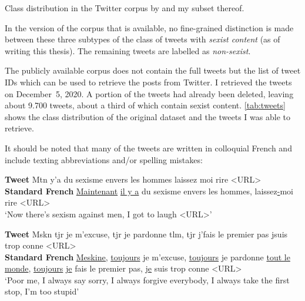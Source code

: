 \begin{table}[tb]
\begin{center}

\end{center}
\caption{Class distribution in the Twitter corpus by \citet{chiril2020annotated} and my subset thereof.}
\label{tab:tweets}
\end{table}

In the version of the corpus that is available, no fine-grained distinction is made between these three subtypes of the class of tweets with \textit{sexist content} (as of writing this thesis).
The remaining tweets are labelled as \textit{non-sexist}.

The publicly available corpus does not contain the full tweets but the list of tweet IDs which can be used to retrieve the posts from Twitter.
I retrieved the tweets on December~5, 2020. 
A portion of the tweets had already been deleted, leaving about 9.700 tweets, about a third of which contain sexist content.
\autoref{tab:tweets} shows the class distribution of the original dataset and the tweets I was able to retrieve.



It should be noted that many of the tweets are written in colloquial French and include texting abbreviations and/or spelling mistakes:


\begin{exe}
\ex 
\gll
\textbf{Tweet} Mtn y'a du sexisme envers les hommes {laissez moi} rire <URL>\\
\textbf{Standard French} \underline{Maintenant} \underline{il y a} du sexisme envers les hommes, laissez\underline{-}moi rire <URL> \\
\trans `Now there's sexism against men, I got to laugh <URL>'
\end{exe}

\begin{exe}
\ex 
\gll
\textbf{Tweet} 
Mskn tjr je m’excuse, tjr je pardonne tlm, tjr j’fais le premier pas jsuis trop conne <URL>
\\
\textbf{Standard French} 
\underline{Meskine,} \underline{toujours} je m’excuse, \underline{toujours} je pardonne \underline{tout le monde}, \underline{toujours} {\underline{je} fais} le premier pas, {\underline{je} suis} trop conne <URL>
 \\
\trans `Poor me, I always say sorry, I always forgive everybody, I always take the first stop, I'm too stupid'
\end{exe}

